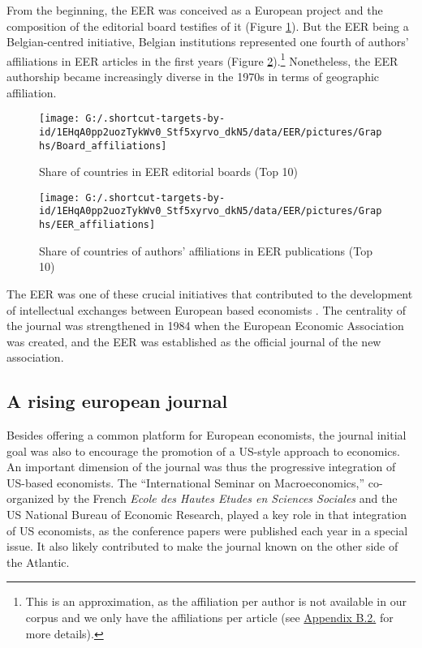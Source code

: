 \documentclass[]{elsarticle} %
\begin{document}
From the beginning, the EER was conceived as a European project and the
composition of the editorial board testifies of it (Figure
\ref{fig:plot-boards}). But the EER being a Belgian-centred initiative,
Belgian institutions represented one fourth of authors' affiliations in
EER articles in the first years (Figure
\ref{fig:plot-authors}).\footnote{This is an approximation, as the
  affiliation per author is not available in our corpus and we only have
  the affiliations per article (see
  \protect\hyperlink{author-affiliation}{Appendix B.2.} for more
  details).} Nonetheless, the EER authorship became increasingly diverse
in the 1970s in terms of geographic affiliation.

\begin{figure}[h]

{\centering \texttt{[image: G:/.shortcut-targets-by-id/1EHqA0pp2uozTykWv0\_Stf5xyrvo\_dkN5/data/EER/pictures/Graphs/Board\_affiliations]} 

}

\caption{Share of countries in EER editorial boards (Top 10)}\label{fig:plot-boards}
\end{figure}

\begin{figure}[h]

{\centering \texttt{[image: G:/.shortcut-targets-by-id/1EHqA0pp2uozTykWv0\_Stf5xyrvo\_dkN5/data/EER/pictures/Graphs/EER\_affiliations]} 

}

\caption{Share of countries of authors' affiliations in EER publications (Top 10)}\label{fig:plot-authors}
\end{figure}

The EER was one of these crucial initiatives that contributed to the
development of intellectual exchanges between European based economists
\citep{goutsmedt2021}. The centrality of the journal was strengthened in
1984 when the European Economic Association was created, and the EER was
established as the official journal of the new association.

\hypertarget{rising-journal}{%
\subsection{A rising european journal}\label{rising-journal}}

Besides offering a common platform for European economists, the journal
initial goal was also to encourage the promotion of a US-style approach
to economics. An important dimension of the journal was thus the
progressive integration of US-based economists. The ``International
Seminar on Macroeconomics,'' co-organized by the French \emph{Ecole des
Hautes Etudes en Sciences Sociales} and the US National Bureau of
Economic Research, played a key role in that integration of US
economists, as the conference papers were published each year in a
special issue. It also likely contributed to make the journal known on
the other side of the Atlantic.
\end{document}

